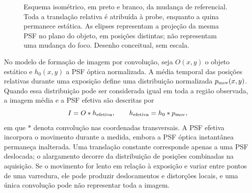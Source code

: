 \documentclass[12pt,a4paper]{article}
\begin{document}
\begin{figure}[!htbp]
    \centering
    \caption{Esquema isométrico, em preto e branco, da mudança de referencial. Toda a translação relativa é atribuída à probe, enquanto a quina permanece estática. As elipses representam a projeção da mesma PSF no plano do objeto, em posições distintas; não representam uma mudança do foco. Desenho conceitual, sem escala.}
    \label{fig:probe-movimento-referencial}
\end{figure}

No modelo de formação de imagem por convolução, seja $O(x,y)$ o objeto estático e $h_0(x,y)$ a PSF óptica normalizada. A média temporal das posições relativas durante uma exposição define uma distribuição normalizada $p_{\rm mov}(x,y)$. Quando essa distribuição pode ser considerada igual em toda a região observada, a imagem média e a PSF efetiva são descritas por
\begin{equation}
    I = O * h_{\rm efetiva},\qquad
    h_{\rm efetiva}=h_0 * p_{\rm mov},
    \label{eq:psf-movimento}
\end{equation}
em que $*$ denota convolução nas coordenadas transversais. A PSF efetiva incorpora o movimento durante a medida, embora a PSF óptica instantânea permaneça inalterada. Uma translação constante corresponde apenas a uma PSF deslocada; o alargamento decorre da distribuição de posições combinadas na aquisição. Se o movimento for lento em relação à exposição e variar entre pontos de uma varredura, ele pode produzir deslocamentos e distorções locais, e uma única convolução pode não representar toda a imagem.
\end{document}

